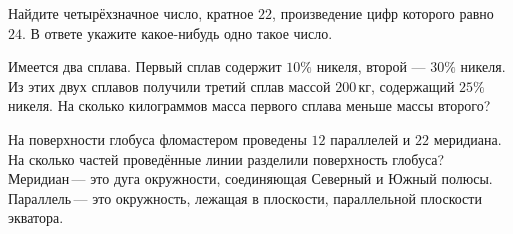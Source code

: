 \begin{class}[number=6]
\begin{listofex}
		\item Найдите четырёхзначное число, кратное \(22\), произведение цифр которого равно \(24\). В ответе укажите какое-нибудь одно такое число.
		\item Имеется два сплава. Первый сплав содержит \(10\%\) никеля, второй --- \(30\%\) никеля. Из этих двух сплавов получили третий сплав массой \(200\) кг, содержащий \(25\%\) никеля. На сколько килограммов масса первого сплава меньше массы второго?
		\item На поверхности глобуса фломастером проведены \(12\) параллелей и \(22\) меридиана. На сколько частей проведённые линии разделили поверхность глобуса? Меридиан --- это дуга окружности, соединяющая Северный и Южный полюсы. Параллель --- это окружность, лежащая в плоскости, параллельной плоскости экватора.
	\end{listofex}
\end{class}

